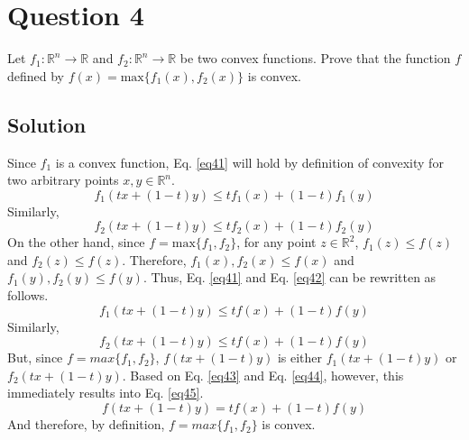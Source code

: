 
\section*{Question 4}

Let $f_1: \mathbb{R}^n \longrightarrow \mathbb{R}$ and $f_2: \mathbb{R}^n \longrightarrow \mathbb{R}$ be two convex functions.
Prove that the function $f$ defined by $f(x) = \text{max}\{f_1(x), f_2(x)\}$ is convex.

\subsection*{Solution}

Since $f_1$ is a convex function, Eq. \ref{eq41} will hold by definition of convexity for two arbitrary points $x, y \in \mathbb{R}^n$.
\begin{equation}
f_1(tx+(1-t)y)\leq tf_1(x) + (1-t)f_1(y)
\label{eq41}
\end{equation}
Similarly,
\begin{equation}
f_2(tx+(1-t)y)\leq tf_2(x) + (1-t)f_2(y)
\label{eq42}
\end{equation}
On the other hand, since $f = \text{max}\{f_1, f_2\}$, for any point $z \in \mathbb{R}^2$, $f_1(z) \leq f(z)$ and $f_2(z) \leq f(z)$.
Therefore, $f_1(x), f_2(x) \leq f(x)$ and $f_1(y), f_2(y) \leq f(y)$.
Thus, Eq. \ref{eq41} and Eq. \ref{eq42} can be rewritten as follows.
\begin{equation}
f_1(tx+(1-t)y)\leq tf(x) + (1-t)f(y)
\label{eq43}
\end{equation}
Similarly,
\begin{equation}
f_2(tx+(1-t)y)\leq tf(x) + (1-t)f(y)
\label{eq44}
\end{equation}
But, since $f = max\{f_1,f_2\}$, $f(tx+(1-t)y)$ is either $f_1(tx+(1-t)y)$ or $f_2(tx+(1-t)y)$.
Based on Eq. \ref{eq43} and Eq. \ref{eq44}, however, this immediately results into Eq. \ref{eq45}.
\begin{equation}
f(tx+(1-t)y) = tf(x) + (1-t)f(y)
\label{eq45}
\end{equation}  
And therefore, by definition, $f = max\{f_1, f_2\}$ is convex.
